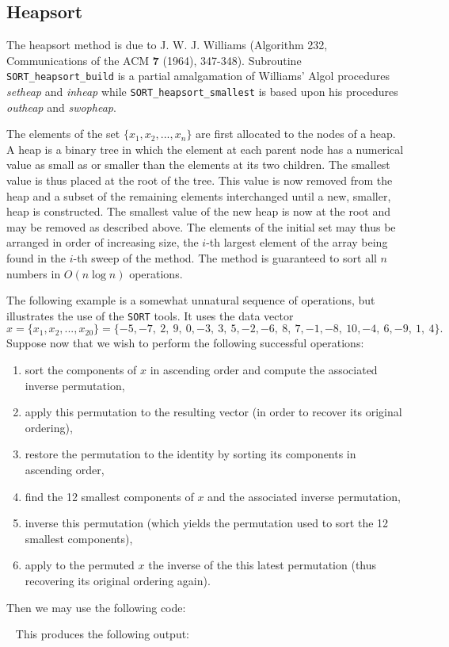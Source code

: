 \documentclass{galahad}
\newcommand{\packagename}{SORT}
\begin{document}
\subsection{Heapsort}

The heapsort method is due to J. W. J.  Williams (Algorithm 232,
Communications of the ACM
{\bf 7 } (1964), 347-348).  Subroutine {\tt \packagename\_heapsort\_build}
is a partial amalgamation of Williams' Algol procedures {\em setheap}
and {\em inheap} while {\tt \packagename\_heapsort\_smallest}
is based upon his procedures {\em outheap} and {\em swopheap}.

\noindent
The elements of the set $\{ x_1 ,   x_2 ,  ...  ,  x_n \}$
are first allocated to the nodes of a heap.  A heap is a binary
tree in which the element at each parent node has a numerical
value as small as or smaller than the elements at its two children.
The smallest value is
thus placed at the root of the tree. This value is now removed from
the heap and a subset of the remaining elements interchanged until a
new, smaller, heap is constructed.  The smallest value of the new heap
is now at the root and may be removed as described above. The elements
of the initial set may thus be arranged in order of increasing size,
the $i$-th largest element of the array being found in the $i$-th
sweep of the method.  The method is guaranteed to sort all $n$ numbers
in $O( n \log n )$ operations.


\galexample
The following example is a somewhat unnatural sequence of operations, but
illustrates the use of the {\tt \packagename} tools. It uses the data vector
\[
x = \{ x_1 ,   x_2 ,  ...  , x_{20} \} =
\{ -5,  -7,  ~2,  ~9,  ~0,  -3,  ~3,  ~5,  -2,  -6,
 ~8,  ~7,  -1,  -8,  ~10,  -4,  ~6,  -9,  ~1,  ~4 \}.
\]
Suppose now that we wish to perform the following successful operations:
\begin{enumerate}
\item sort the components of $x$ in ascending order and compute the associated
inverse permutation,
\item apply this permutation to the resulting vector (in order to recover its
original ordering),
\item restore the permutation to the identity by sorting its components in
ascending order,
\item find the 12 smallest components of $x$ and the associated inverse
permutation,
\item inverse this permutation (which yields the permutation used to sort the
12 smallest components),
\item
apply to the permuted $x$ the inverse of the this latest permutation (thus
recovering its original ordering again).
\end{enumerate}
Then we may use the following code:


{\tt \small
\VerbatimInput{\packageexample}
}
\noindent
This produces the following output:
{\tt \small
\VerbatimInput{\packageresults}
}
\end{document}
